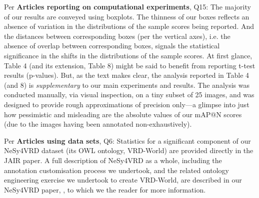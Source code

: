 \documentclass[]{jair}
\begin{document}
Per \textbf{Articles reporting on computational experiments}, Q15: The majority of our results are conveyed using boxplots. The thinness of our boxes reflects an absence of variation in the distributions of the sample scores being reported. And the distances between corresponding boxes (per the vertical axes), i.e. the absence of overlap between corresponding boxes, signals the statistical significance in the shifts in the distributions of the sample scores. At first glance, Table 4 (and its extension, Table 8) might be said to benefit from reporting t-test results (p-values). But, as the text makes clear, the analysis reported in Table 4 (and 8) is \emph{supplementary} to our main experiments and results.  The analysis was conducted manually, via visual inspection, on a tiny subset of 25 images, and was designed to provide rough approximations of precision only---a glimpse into just how pessimistic and misleading are the absolute values of our mAP@N scores (due to the images having been annotated non-exhaustively).

Per \textbf{Articles using data sets}, Q6: Statistics for a significant component of our NeSy4VRD dataset (its OWL ontology, VRD-World) are provided directly in the JAIR paper. A full description of NeSy4VRD as a whole, including the annotation customisation process we undertook, and the related ontology engineering exercise we undertook to create VRD-World, are described in our NeSy4VRD paper, \citet{Herron/2023/nesy4vrd}, to which we the reader for more information.
\end{document}
